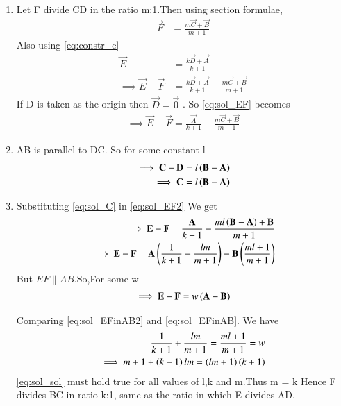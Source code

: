 \renewcommand{\theequation}{\theenumi}
\begin{enumerate}[label=\thesection.\arabic*.,ref=\thesection.\theenumi]

\item Let F divide CD in the ratio m:1.Then using section formulae,
\begin{align}
\vec{F} &= \frac{{{m\vec{C}} +\vec{B}}}{m+1}
\end{align}
%
Also using \ref{eq:constr_e}
\begin{align}
\vec{E} &= \frac{{{k\vec{D}} +\vec{A}}}{k+1}
\\
\implies \vec{E} - \vec{F} &= \frac{{{k\vec{D}} +\vec{A}}}{k+1}-\frac{{{m\vec{C}} +\vec{B}}}{m+1}
\label{eq:sol_EF}
\end{align}
If D is taken as the origin then $\vec{D} = \vec{0}$ . So \ref{eq:sol_EF} becomes
\begin{align}
\implies \vec{E} - \vec{F} = \frac{\vec{A}}{k+1}-\frac{{{m\vec{C}} +\vec{B}}}{m+1}
\label{eq:sol_EF2}
\end{align}

\item AB is parallel to DC. So for some constant l
\begin{align}
\implies \mathbf{C}-\mathbf{D} &= l\left(\mathbf{B}-\mathbf{A}\right)
\\
\implies \mathbf{C} &= l\left(\mathbf{B}-\mathbf{A}\right)
\label{eq:sol_C}
\end{align}

\item Substituting \ref{eq:sol_C} in \ref{eq:sol_EF2} We get
\begin{align}
\implies \mathbf{E} - \mathbf{F} = \frac{\mathbf{A}}{k+1}-\frac{{{ml\left(\mathbf{B}-\mathbf{A}\right)} +\mathbf{B}}}{m+1}
\\
\implies \mathbf{E} - \mathbf{F} = \mathbf{A}\left(\frac{1}{k+1} + \frac{lm}{m+1}\right) - \mathbf{B}\left(\frac{ml+1}{m+1}\right)
\label{eq:sol_EFinAB}
\end{align}
But $ EF \parallel AB$.So,For some w
\begin{align}
\implies \mathbf{E} - \mathbf{F} = w\left(\mathbf{A}-\mathbf{B}\right)
\label{eq:sol_EFinAB2}
\end{align}

Comparing \ref{eq:sol_EFinAB2} and \ref{eq:sol_EFinAB}. We have
\begin{align}
\frac{1}{k+1} + \frac{lm}{m+1} = \frac{ml+1}{m+1} = w
\\
\implies m+1+\left(k+1\right)lm = \left(lm+1\right)\left(k+1\right) 
\label{eq:sol_sol}
\end{align}
\ref{eq:sol_sol} must hold true for all values of l,k and m.Thus m = k
\newline
Hence F divides BC in ratio k:1, same as the ratio in which E divides AD.
\end{enumerate}
